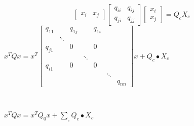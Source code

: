 \documentclass{article}
\begin{document}
\[ \left[\begin{array}{cc}
      x_i & x_j
    \end{array}\right] \left[\begin{array}{cc}
      q_{i i} & q_{i j} \\
      q_{j i} & q_{j j}
    \end{array}\right] \left[\begin{array}{c}
      x_i \\
      x_j
    \end{array}\right] = Q_c X_c \]
$x^T Q x = x^T \left[\begin{array}{ccccccc}
      q_{11}  &        & q_{1 j} &        & q_{1 i} &        &         \\
              & \ddots &         &        &         &        &         \\
      q_{j 1} &        & 0       &        & 0       &        &         \\
              &        &         & \ddots &         &        &         \\
      q_{i 1} &        & 0       &        & 0       &        &         \\
              &        &         &        &         & \ddots &         \\
              &        &         &        &         &        & q_{n n}
    \end{array}\right] x + Q_c \bullet X_c$

\

$x^T Q x = x^T Q_0 x + \sum_{_c} Q_c \bullet X_c$

\
\end{document}
